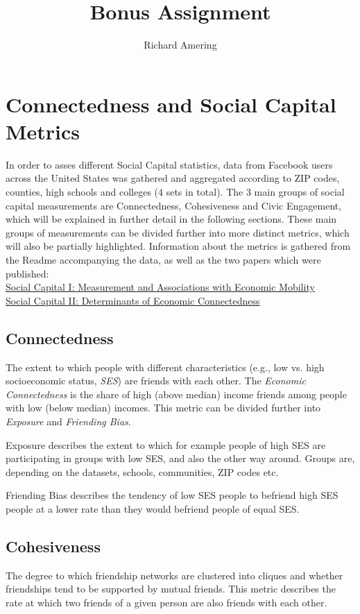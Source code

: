 \documentclass[11pt,a4paper]{article}
\author{Richard Amering}
\title{Bonus Assignment}
\begin{document}

\maketitle
\section{Connectedness and Social Capital Metrics}
In order to asses different Social Capital statistics, data from Facebook users across the United States was gathered and aggregated according to ZIP codes, counties, high schools and colleges (4 sets in total). The 3 main groups of social capital measurements are Connectedness, Cohesiveness and Civic Engagement, which will be explained in further detail in the following sections. These main groups of measurements can be divided further into more distinct metrics, which will also be partially highlighted. Information about the metrics is gathered from the Readme accompanying the data, as well as the two papers which were published: \\
\href{https://doi.org/10.1038/s41586-022-04996-4}{Social Capital I: Measurement and Associations with Economic Mobility} \\
\href{https://doi.org/10.1038/s41586-022-04997-3}{Social Capital II: Determinants of Economic Connectedness}


\subsection{Connectedness}
The extent to which people with different characteristics (e.g., low vs. high socioeconomic status, \textit{SES}) are friends with each other. The \textit{Economic Connectedness} is the share of high (above median) income friends among people with low (below median) incomes. This metric can be divided further into \textit{Exposure} and \textit{Friending Bias}.

Exposure describes the extent to which for example people of high SES are participating in groups with low SES, and also the other way around. Groups are, depending on the datasets, schools, communities, ZIP codes etc.

Friending Bias describes the tendency of low SES people to befriend high SES people at a lower rate than they would befriend people of equal SES.


\subsection{Cohesiveness}
The degree to which friendship networks are clustered into cliques and whether friendships tend to be supported by mutual friends. This metric describes the rate at which two friends of a given person are also friends with each other.
\end{document}
